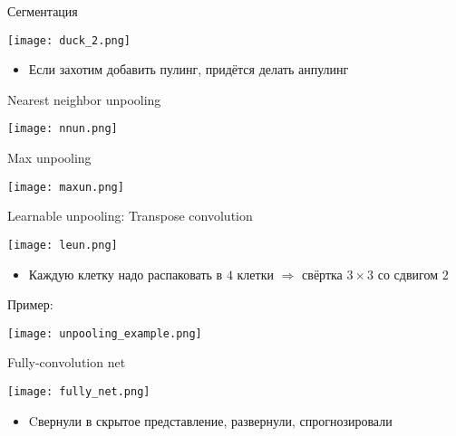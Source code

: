 \documentclass[notes,12pt, aspectratio=169]{beamer}
\begin{document}
\begin{frame}{Сегментация}
\begin{center}
\texttt{[image: duck\_2.png]}
\end{center}
\begin{itemize}
\item Если захотим добавить пулинг, придётся делать анпулинг
\end{itemize}
\end{frame}


\begin{frame}{Nearest neighbor unpooling}
\begin{center}
\texttt{[image: nnun.png]}
\end{center}
\end{frame}


\begin{frame}{Max unpooling}
\begin{center}
\texttt{[image: maxun.png]}
\end{center}
\end{frame}


\begin{frame}{Learnable unpooling: Transpose convolution}
\begin{center}
\texttt{[image: leun.png]}
\end{center}
\begin{itemize}
	\item Каждую клетку надо распаковать в $4$ клетки $\Rightarrow$ свёртка $3 \times 3$ со сдвигом $2$
\end{itemize}
\end{frame}

\begin{frame}{Пример:}
\begin{center}
	\texttt{[image: unpooling\_example.png]}
\end{center}
\end{frame}





\begin{frame}{Fully-convolution net}
\begin{center}
	\texttt{[image: fully\_net.png]}
\end{center}
\begin{itemize}
	\item Cвернули в скрытое представление, развернули, спрогнозировали
\end{itemize}
\end{frame}
\end{document}
